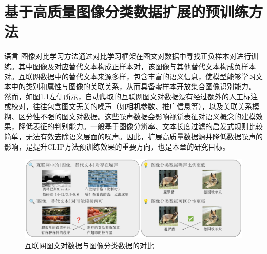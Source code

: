 \chapter{基于高质量图像分类数据扩展的预训练方法}
\label{cha:iclip}
\label{sec:iclip-intro}
语言-图像对比学习方法通过对比学习框架在图文对数据中寻找正负样本对进行训练。其中图像及对应替代文本构成正样本对，该图像与其他替代文本构成负样本对。互联网数据中的替代文本来源多样，包含丰富的语义信息，使模型能够学习文本中的类别和属性与图像的关联关系，从而具备零样本开放集合图像识别能力。
然而，如图\ref{fig:iclip-overall}左侧所示，自动爬取的互联网图文对数据没有经过额外的人工标注或校对，往往包含图文无关的噪声（如相机参数、推广信息等），以及关联关系模糊、区分性不强的图文对数据。这些噪声数据会影响视觉表征对语义概念的建模效果，降低表征的判别能力。一般基于图像分辨率、文本长度过滤的启发式规则\cite{sharma-etal-2018-conceptual,changpinyo2021conceptual}比较简单，无法有效去除语义层面的噪声。因此，扩展高质量数据源并降低数据噪声的影响，是提升CLIP方法预训练效果的重要方向，也是本章的研究目标。

\begin{figure}
  \centering
  \includegraphics[width=1.0\linewidth]{figures/论文-iCLIP-概要.pdf}
  \caption{互联网图文对数据与图像分类数据的对比}
  \label{fig:iclip-overall}
\end{figure}

